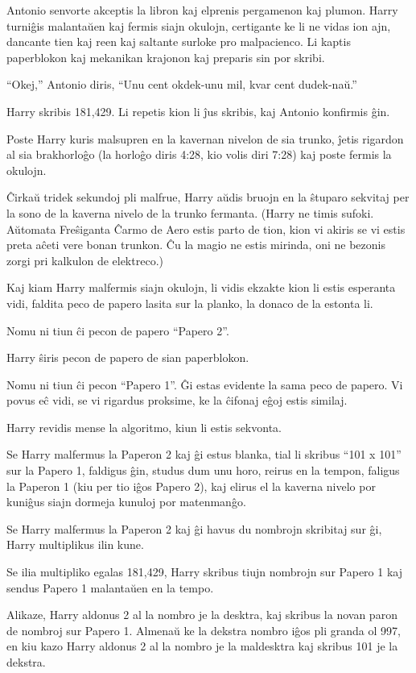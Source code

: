 Antonio senvorte akceptis la libron kaj elprenis pergamenon kaj
plumon. Harry turniĝis malantaŭen kaj fermis siajn okulojn, certigante
ke li ne vidas ion ajn, dancante tien kaj reen kaj saltante surloke
pro malpacienco. Li kaptis paperblokon kaj mekanikan krajonon kaj
preparis sin por skribi.

``Okej,'' Antonio diris, ``Unu cent okdek-unu mil, kvar cent
dudek-naŭ.''

Harry skribis 181,429. Li repetis kion li ĵus skribis, kaj Antonio konfirmis ĝin.

Poste Harry kuris malsupren en la kavernan nivelon de sia trunko,
ĵetis rigardon al sia brakhorloĝo (la horloĝo diris 4:28, kio volis
diri 7:28) kaj poste fermis la okulojn.

Ĉirkaŭ tridek sekundoj pli malfrue, Harry aŭdis bruojn en la ŝtuparo
sekvitaj per la sono de la kaverna nivelo de la trunko
fermanta. (Harry ne timis sufoki. Aŭtomata Freŝiganta Ĉarmo de Aero
estis parto de tion, kion vi akiris se vi estis preta aĉeti vere bonan
trunkon. Ĉu la magio ne estis mirinda, oni ne bezonis zorgi pri kalkulon
de elektreco.)

Kaj kiam Harry malfermis siajn okulojn, li vidis ekzakte kion li estis
esperanta vidi, faldita peco de papero lasita sur la planko, la donaco
de la estonta li.

Nomu ni tiun ĉi pecon de papero ``Papero 2''.

Harry ŝiris pecon de papero de sian paperblokon.

Nomu ni tiun ĉi pecon ``Papero 1''. Ĝi estas evidente la sama peco de
papero. Vi povus eĉ vidi, se vi rigardus proksime, ke la ĉifonaj eĝoj
estis similaj.

Harry revidis mense la algoritmo, kiun li estis sekvonta.

Se Harry malfermus la Paperon 2 kaj ĝi estus blanka, tial li skribus
``101 x 101'' sur la Papero 1, faldigus ĝin, studus dum unu horo,
reirus en la tempon, faligus la Paperon 1 (kiu per tio iĝos Papero 2),
kaj elirus el la kaverna nivelo por kuniĝus siajn dormeja kunuloj por
matenmanĝo.

Se Harry malfermus la Paperon 2 kaj ĝi havus du nombrojn skribitaj sur
ĝi, Harry multiplikus ilin kune.

Se ilia multipliko egalas 181,429, Harry skribus tiujn nombrojn sur
Papero 1 kaj sendus Papero 1 malantaŭen en la tempo.

Alikaze, Harry aldonus 2 al la nombro je la desktra, kaj skribus la
novan paron de nombroj sur Papero 1. Almenaŭ ke la dekstra nombro iĝos
pli granda ol 997, en kiu kazo Harry aldonus 2 al la nombro je la
maldesktra kaj skribus 101 je la dekstra.

